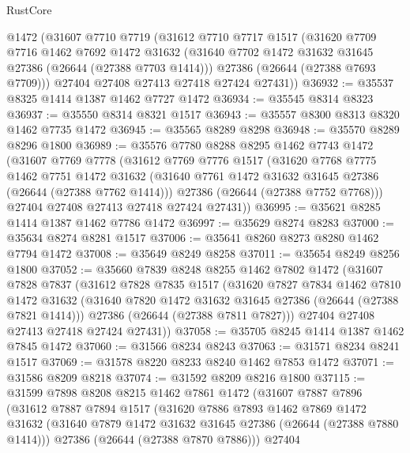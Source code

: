 \begin{lexlean}{RustCore}
\begin{coremodule}
    @1472
    (@31607
      @7710
      @7719
      (@31612
        @7710
        @7717
        @1517
        (@31620
          @7709
          @7716
          @1462
          @7692
          @1472
          @31632
          (@31640 @7702 @1472 @31632 @31645 @27386 (@26644 (@27388 @7703 @1414)))
          @27386
          (@26644 (@27388 @7693 @7709)))
        @27404
        @27408
        @27413
        @27418
        @27424
        @27431))
@36932 := @35537 @8325 @1414 @1387 @1462 @7727 @1472
@36934 := @35545 @8314 @8323
@36937 := @35550 @8314 @8321 @1517
@36943 := @35557 @8300 @8313 @8320 @1462 @7735 @1472
@36945 := @35565 @8289 @8298
@36948 := @35570 @8289 @8296 @1800
@36989 := @35576
    @7780
    @8288
    @8295
    @1462
    @7743
    @1472
    (@31607
      @7769
      @7778
      (@31612
        @7769
        @7776
        @1517
        (@31620
          @7768
          @7775
          @1462
          @7751
          @1472
          @31632
          (@31640 @7761 @1472 @31632 @31645 @27386 (@26644 (@27388 @7762 @1414)))
          @27386
          (@26644 (@27388 @7752 @7768)))
        @27404
        @27408
        @27413
        @27418
        @27424
        @27431))
@36995 := @35621 @8285 @1414 @1387 @1462 @7786 @1472
@36997 := @35629 @8274 @8283
@37000 := @35634 @8274 @8281 @1517
@37006 := @35641 @8260 @8273 @8280 @1462 @7794 @1472
@37008 := @35649 @8249 @8258
@37011 := @35654 @8249 @8256 @1800
@37052 := @35660
    @7839
    @8248
    @8255
    @1462
    @7802
    @1472
    (@31607
      @7828
      @7837
      (@31612
        @7828
        @7835
        @1517
        (@31620
          @7827
          @7834
          @1462
          @7810
          @1472
          @31632
          (@31640 @7820 @1472 @31632 @31645 @27386 (@26644 (@27388 @7821 @1414)))
          @27386
          (@26644 (@27388 @7811 @7827)))
        @27404
        @27408
        @27413
        @27418
        @27424
        @27431))
@37058 := @35705 @8245 @1414 @1387 @1462 @7845 @1472
@37060 := @31566 @8234 @8243
@37063 := @31571 @8234 @8241 @1517
@37069 := @31578 @8220 @8233 @8240 @1462 @7853 @1472
@37071 := @31586 @8209 @8218
@37074 := @31592 @8209 @8216 @1800
@37115 := @31599
    @7898
    @8208
    @8215
    @1462
    @7861
    @1472
    (@31607
      @7887
      @7896
      (@31612
        @7887
        @7894
        @1517
        (@31620
          @7886
          @7893
          @1462
          @7869
          @1472
          @31632
          (@31640 @7879 @1472 @31632 @31645 @27386 (@26644 (@27388 @7880 @1414)))
          @27386
          (@26644 (@27388 @7870 @7886)))
        @27404

\end{coremodule}
\end{lexlean}
